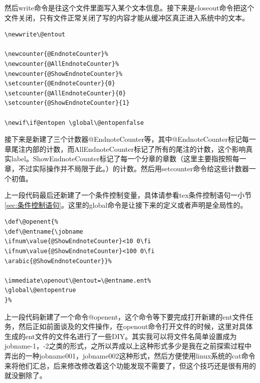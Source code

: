 \documentclass[11pt,oneside]{book}
\begin{document}
然后write命令是往这个文件里面写入某个文本信息。接下来是closeout命令把这个文件关闭，只有文件正常关闭了写的内容才能从缓冲区真正进入系统中的文本。


\begin{Verbatim}
\newwrite\@entout

\newcounter{@EndnoteCounter}%
\newcounter{@AllEndnoteCounter}%
\newcounter{@ShowEndnoteCounter}%
\setcounter{@EndnoteCounter}{0}
\setcounter{@AllEndnoteCounter}{0}
\setcounter{@ShowEndnoteCounter}{1}

\newif\if@entopen \global\@entopenfalse
\end{Verbatim}
接下来是新建了三个计数器@EndnoteCounter等，其中@EndnoteCounter标记每一章尾注内部的计数，而AllEndnoteCounter标记了所有的尾注的计数，这个影响真实label。ShowEndnoteCounter标记了每一个分章的章数（这里主要指按照每一章，不过实际操作并不局限于此。）的计数。然后用setcounter命令给这些计数器一个初值。

上一段代码最后还新建了一个条件控制变量，具体请参看tex条件控制语句一小节\ref{sec:条件控制语句}。这里的global命令是让接下来的定义或者声明是全局性的。

\begin{Verbatim}
\def\@openent{%
\def\@entname{\jobname
\ifnum\value{@ShowEndnoteCounter}<10 0\fi
\ifnum\value{@ShowEndnoteCounter}<100 0\fi
\arabic{@ShowEndnoteCounter}}%

\immediate\openout\@entout=\@entname.ent%
\global\@entopentrue
}%
\end{Verbatim}
上一段代码新建了一个命令@openent，这个命令等下要完成打开新建的ent文件任务，然后正如前面谈及的文件操作，在openout命令打开文件的时候，这里对具体生成的ent文件的文件名进行了一些DIY。其实我可以将文件名简单设置成为jobname-1，-2之类的形式，之所以弄成以上这种形式多少是我在之前探索过程中弄出的一种jobname001，jobname002这种形式，然后方便使用linux系统的cat命令来将他们汇总，后来修改修改着这个功能发现不需要了，但这个技巧还是很有用的就没删除了。
\end{document}
